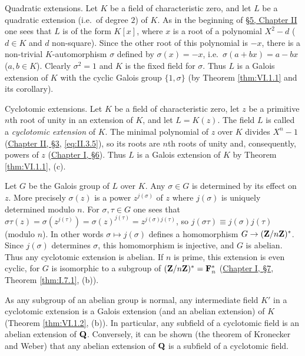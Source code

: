 \begin{example}\label{exa:VI.1.1}
Quadratic extensions. Let $K$ be a field of characteristic zero, and let $L$ be a quadratic
extension (i.e.\ of degree $2$) of $K$. As in the beginning of \hyperref[sec:2.5]{§5,
Chapter II} one sees that $L$ is of the form $K[x]$, where $x$ is a root of
a polynomial $X^{2}-d$ ($d\in K$ and $d$ non-square). Since the other root
of this polynomial is $-x$, there is a non-trivial $K$-automorphism
$\sigma$ defined by $\sigma(x)=-x$, i.e.\ $\sigma(a+bx)=a-bx$
($a,b\in K$). Clearly $\sigma^{2}=1$ and $K$ is the fixed field for
$\sigma$. Thus $L$ is a Galois extension of $K$ with the cyclic Galois
group $\{1,\sigma\}$ (by Theorem \ref{thm:VI.1.1} and its corollary).
\end{example}

\begin{example}\label{exa:VI.1.2}
Cyclotomic extensions. Let $K$ be a field of characteristic zero, let $z$ be a primitive $n$th
root of unity in an extension of $K$, and let $L=K(z)$. The field $L$ is
called a \emph{cyclotomic extension} of $K$. The minimal polynomial of $z$
over $K$ divides $X^{n}-1$ (\hyperref[sec:2.3]{Chapter II, §3}, \eqref{eq:II.3.5}), so its
roots are $n$th roots of unity and, consequently, powers of $z$
(\hyperref[sec:1.6]{Chapter I, §6}). Thus $L$ is a Galois extension of $K$ by Theorem
\ref{thm:VI.1.1}, (c).
\end{example}

Let $G$ be the Galois group of $L$ over $K$. Any $\sigma\in G$ is
determined by its effect on $z$. More precisely $\sigma(z)$ is a power
$z^{j(\sigma)}$ of $z$ where $j(\sigma)$ is uniquely determined modulo
$n$. For $\sigma,\tau\in G$ one sees that
$\sigma\tau(z)=\sigma(z^{j(\tau)})=\sigma(z)^{j(\tau)}
=z^{j(\sigma)j(\tau)}$, so $j(\sigma\tau)\equiv j(\sigma)j(\tau)$
(modulo $n$). In other words $\sigma\mapsto j(\sigma)$ defines a
homomorphism $G\to(\mathbf{Z}/n\mathbf{Z})^{*}$. Since $j(\sigma)$ determines $\sigma$,
this homomorphism is injective, and $G$ is abelian. Thus any cyclotomic
extension is abelian. If $n$ is prime, this extension is even cyclic, for
$G$ is isomorphic to a subgroup of
$(\mathbf{Z}/n\mathbf{Z})^{*}=\mathbf{F}_{n}^{*}$ (\hyperref[sec:1.7]{Chapter I, §7}, Theorem \ref{thm:I.7.1}, (b)).

As any subgroup of an abelian group is normal, any intermediate field $K'$
in a cyclotomic extension is a Galois extension (and an abelian extension)
of $K$ (Theorem \ref{thm:VI.1.2}, (b)). In particular, any subfield of a
cyclotomic field is an abelian extension of $\mathbf{Q}$. Conversely, it can be
shown (the theorem of Kronecker and Weber) that any abelian extension of
$\mathbf{Q}$ is a subfield of a cyclotomic field.

